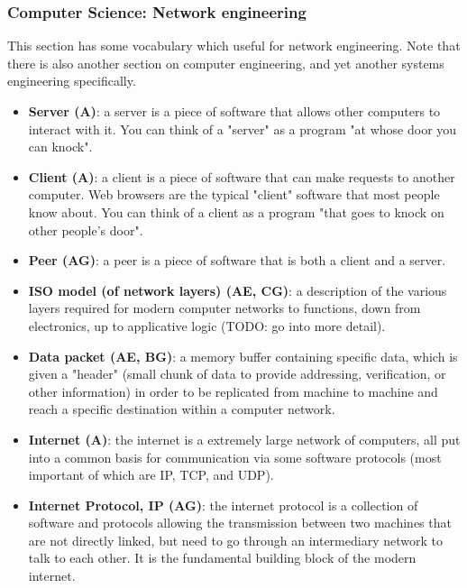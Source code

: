 \documentclass{article}
\begin{document}
\subsubsection*{Computer Science: Network engineering}

This section has some vocabulary which useful for network engineering. Note that there is also another section on computer engineering, and yet another systems engineering specifically. 

\begin{itemize}

	\item \textbf{Server (A)}: a server is a piece of software that allows other computers to interact with it. You can think of a "server" as a program "at whose door you can knock".

	\item \textbf{Client (A)}: a client is a piece of software that can make requests to another computer. Web browsers are the typical "client" software that most people know about. You can think of a client as a program "that goes to knock on other people's door".

	\item \textbf{Peer (AG)}: a peer is a piece of software that is both a client and a server.

	\item \textbf{ISO model (of network layers) (AE, CG)}: a description of the various layers required for modern computer networks to functions, down from electronics, up to applicative logic (TODO: go into more detail).

	\item \textbf{Data packet (AE, BG)}: a memory buffer containing specific data, which is given a "header" (small chunk of data to provide addressing, verification, or other information) in order to be replicated from machine to machine and reach a specific destination within a computer network.

	\item \textbf{Internet (A)}: the internet is a extremely large network of computers, all put into a common basis for communication via some software protocols (most important of which are IP, TCP, and UDP).

	\item \textbf{Internet Protocol, IP (AG)}: the internet protocol is a collection of software and protocols allowing the transmission between two machines that are not directly linked, but need to go through an intermediary network to talk to each other. It is the fundamental building block of the modern internet.


\end{itemize}
\end{document}
